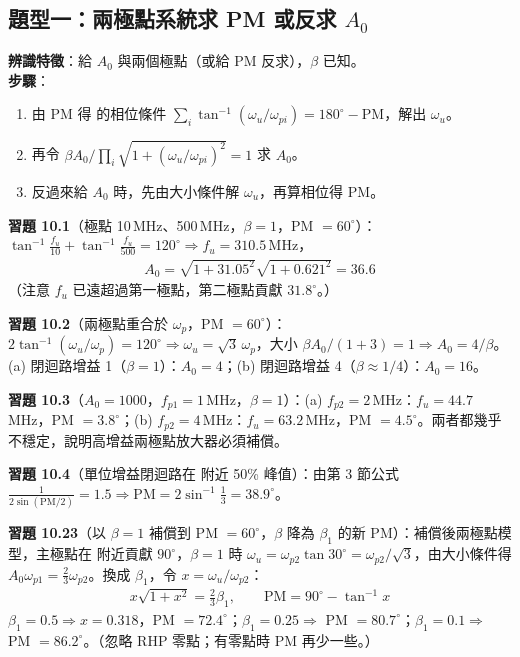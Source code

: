 \documentclass[11pt,a4paper]{article}
\newcommand{\GX}{\text{GX}}
\begin{document}
\subsection{題型一：兩極點系統求 PM 或反求 $A_0$}
\textbf{辨識特徵}：給 $A_0$ 與兩個極點（或給 PM 反求），$\beta$ 已知。\\
\textbf{步驟}：
\begin{enumerate}[leftmargin=2.2em,itemsep=0pt]
  \item 由 PM 得 \GX{} 的相位條件 $\sum_i\tan^{-1}(\omega_u/\omega_{pi})=180^\circ-\text{PM}$，解出 $\omega_u$。
  \item 再令 $\beta A_0\big/\prod_i\sqrt{1+(\omega_u/\omega_{pi})^2}=1$ 求 $A_0$。
  \item 反過來給 $A_0$ 時，先由大小條件解 $\omega_u$，再算相位得 PM。
\end{enumerate}

\textbf{習題 10.1}（極點 10\,MHz、500\,MHz，$\beta=1$，PM $=60^\circ$）：$\tan^{-1}\frac{f_u}{10}+\tan^{-1}\frac{f_u}{500}=120^\circ\Rightarrow f_u=310.5$\,MHz，
\begin{align}
A_0=\sqrt{1+31.05^2}\sqrt{1+0.621^2}=\boxed{36.6}
\end{align}
（注意 $f_u$ 已遠超過第一極點，第二極點貢獻 $31.8^\circ$。）

\textbf{習題 10.2}（兩極點重合於 $\omega_p$，PM $=60^\circ$）：$2\tan^{-1}(\omega_u/\omega_p)=120^\circ\Rightarrow\omega_u=\sqrt3\,\omega_p$，大小 $\beta A_0/(1+3)=1\Rightarrow A_0=4/\beta$。(a) 閉迴路增益 1（$\beta=1$）：$A_0=\boxed{4}$；(b) 閉迴路增益 4（$\beta\approx1/4$）：$A_0=\boxed{16}$。

\textbf{習題 10.3}（$A_0=1000$，$f_{p1}=1$\,MHz，$\beta=1$）：(a) $f_{p2}=2$\,MHz：$f_u=44.7$\,MHz，PM $=\boxed{3.8^\circ}$；(b) $f_{p2}=4$\,MHz：$f_u=63.2$\,MHz，PM $=\boxed{4.5^\circ}$。兩者都幾乎不穩定，說明高增益兩極點放大器必須補償。

\textbf{習題 10.4}（單位增益閉迴路在 \GX{} 附近 50\% 峰值）：由第 3 節公式 $\frac{1}{2\sin(\text{PM}/2)}=1.5\Rightarrow\text{PM}=2\sin^{-1}\frac13=\boxed{38.9^\circ}$。

\textbf{習題 10.23}（以 $\beta=1$ 補償到 PM $=60^\circ$，$\beta$ 降為 $\beta_1$ 的新 PM）：補償後兩極點模型，主極點在 \GX{} 附近貢獻 $90^\circ$，$\beta=1$ 時 $\omega_u=\omega_{p2}\tan30^\circ=\omega_{p2}/\sqrt3$，由大小條件得 $A_0\omega_{p1}=\frac23\omega_{p2}$。換成 $\beta_1$，令 $x=\omega_u/\omega_{p2}$：
\begin{align}
x\sqrt{1+x^2}=\tfrac23\beta_1,\qquad \text{PM}=90^\circ-\tan^{-1}x
\end{align}
$\beta_1=0.5\Rightarrow x=0.318$，PM $=72.4^\circ$；$\beta_1=0.25\Rightarrow$ PM $=80.7^\circ$；$\beta_1=0.1\Rightarrow$ PM $=86.2^\circ$。（忽略 RHP 零點；有零點時 PM 再少一些。）
\end{document}
